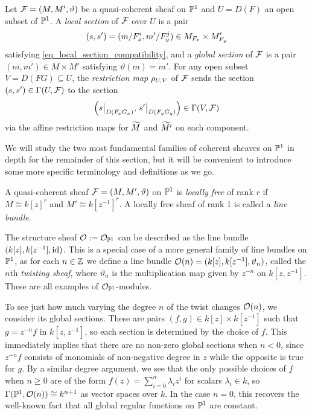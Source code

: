 \begin{definition}
  \label{def_coh_sheaf_sects_and_restr}
  Let $\mathcal{F} = (M, M', \vartheta)$ be a quasi-coherent sheaf on
  $\mathbb{P}^{{1}}$ and $U = D(F)$ an open subset of $\mathbb{P}^{{1}}$.
  A \emph{local section} of $\mathcal{F}$ over $U$ is a pair
  \[
    (s, s')  = (m/{{F}}_{{x}}^i, m'/{{F}}_{{y}}^j) \in
    M_{{{F}}_{{x}}} \times M'_{{{F}}_{{y}}}
  \]
  satisfying \cref{eq_local_section_compatibility},
  and a \emph{global section} of $\mathcal{F}$ is a pair $(m, m') \in M
  \times M'$ satisfying $\vartheta(m) = m'$.
  For any open subset $V = D(FG) \subseteq U$, the \emph{restriction
  map} $\rho_{{U}, {V}}$ of $\mathcal{F}$ sends the section $(s, s') \in
  \Gamma({U}, {\mathcal{F}})$ to the section
  \[
    \left(\setres{s}{D(\dehomog{F}{x} \dehomog{G}{x})},\,
    \setres{s'}{D(\dehomog{F}{y} \dehomog{G}{y})}\right) \in
    \sections{V}{\shf{F}}
  \]
  via the affine restriction maps for $\widetilde{{M}}$ and $\widetilde{{M'}}$
  on each component.
\end{definition}

We will study the two most fundamental families of coherent sheaves
on $\mathbb{P}^{{1}}$ in depth for the remainder of this section, but it will
be convenient to introduce some more specific terminology and
definitions as we go.

\begin{definition}
  A quasi-coherent sheaf $\mathcal{F} = (M, M', \vartheta)$ on $\mathbb{P}^{{1}}$
  is \emph{locally free} of rank $r$ if $M \cong k[z]^r$ and $M'
  \cong k[z^{-1}]^r$.
  A locally free sheaf of rank 1 is called a \emph{line bundle}.
\end{definition}

\begin{example}
  \label{exmp_twists}
  The structure sheaf $\mathcal{O} := \mathcal{O}_{{\mathbb{P}^{{1}}}}$ can be described
  as the line bundle $(k[z], k[z^{-1}], \operatorname{id})$.
  This is a special case of a more general family of line bundles on
  $\mathbb{P}^{{1}}$, as for each $n \in \mathbb{Z}$ we define a line bundle
  $\mathcal{O}({n}) = (k[z], k[z^{-1}], \vartheta_n)$, called the $n$th
  \emph{twisting sheaf}, where $\vartheta_n$ is the multiplication
  map given by $z^{-n}$ on $k[z, z^{-1}]$.
  These are all examples of $\mathcal{O}_{{\mathbb{P}^{{1}}}}$-modules. \noparskip

  To see just how much varying the degree $n$ of the twist changes
  $\mathcal{O}({n})$, we consider its global sections.
  These are pairs $(f, g) \in k[z] \times k[z^{-1}]$ such that $g =
  z^{-n} f$ in $k[z, z^{-1}]$, so each section is determined by the
  choice of $f$.
  This immediately implies that there are no non-zero global sections
  when $n < 0$, since $z^{-n} f$ consists of monomials of
  non-negative degree in $z$ while the opposite is true for $g$.
  By a similar degree argument, we see that the only possible choices
  of $f$ when $n \geq 0$ are of the form $f(z) = \sum_{i = 0}^{n}
  \lambda_i z^i$ for scalars $\lambda_i \in k$, so
  $\Gamma({\mathbb{P}^{{1}}}, {\mathcal{O}({n})}) \cong k^{n + 1}$ as vector spaces over $k$.
  In the case $n = 0$, this recovers the well-known fact that all
  global regular functions on $\mathbb{P}^{{1}}$ are constant.
\end{example}

